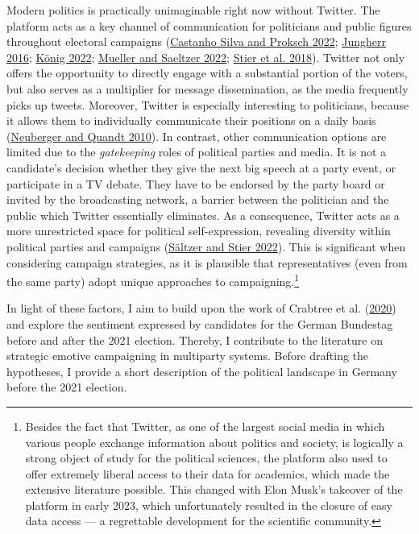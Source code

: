 \documentclass[a4paper,11pt]{article}
\begin{document}
Modern politics is practically unimaginable right now without Twitter. The platform acts as a key channel of communication for politicians and public figures throughout electoral campaigns (\protect\hyperlink{ref-castanhosilvaPoliticiansUnleashedPolitical2022}{Castanho Silva and Proksch 2022}; \protect\hyperlink{ref-jungherrTwitterUseElection2016}{Jungherr 2016}; \protect\hyperlink{ref-konigEPINetzTwitterPoliticians2022}{König 2022}; \protect\hyperlink{ref-muellerTwitterMadeMe2022}{Mueller and Saeltzer 2022}; \protect\hyperlink{ref-stierElectionCampaigningSocial2018}{Stier et al. 2018}). Twitter not only offers the opportunity to directly engage with a substantial portion of the voters, but also serves as a multiplier for message dissemination, as the media frequently picks up tweets. Moreover, Twitter is especially interesting to politicians, because it allows them to individually communicate their positions on a daily basis (\protect\hyperlink{ref-neubergerInternetJournalismusVomTraditionellen2010}{Neuberger and Quandt 2010}). In contrast, other communication options are limited due to the \emph{gatekeeping} roles of political parties and media. It is not a candidate's decision whether they give the next big speech at a party event, or participate in a TV debate. They have to be endorsed by the party board or invited by the broadcasting network, a barrier between the politician and the public which Twitter essentially eliminates. As a consequence, Twitter acts as a more unrestricted space for political self-expression, revealing diversity within political parties and campaigns (\protect\hyperlink{ref-saeltzerBundestagswahl2021Auf2022}{Sältzer and Stier 2022}). This is significant when considering campaign strategies, as it is plausible that representatives (even from the same party) adopt unique approaches to campaigning.\footnote{Besides the fact that Twitter, as one of the largest social media in which various people exchange information about politics and society, is logically a strong object of study for the political sciences, the platform also used to offer extremely liberal access to their data for academics, which made the extensive literature possible. This changed with Elon Musk's takeover of the platform in early 2023, which unfortunately resulted in the closure of easy data access --- a regrettable development for the scientific community.}

In light of these factors, I aim to build upon the work of Crabtree et al. (\protect\hyperlink{ref-crabtreeItNotOnly2020}{2020}) and explore the sentiment expressed by candidates for the German Bundestag before and after the 2021 election. Thereby, I contribute to the literature on strategic emotive campaigning in multiparty systems. Before drafting the hypotheses, I provide a short description of the political landscape in Germany before the 2021 election.
\end{document}

